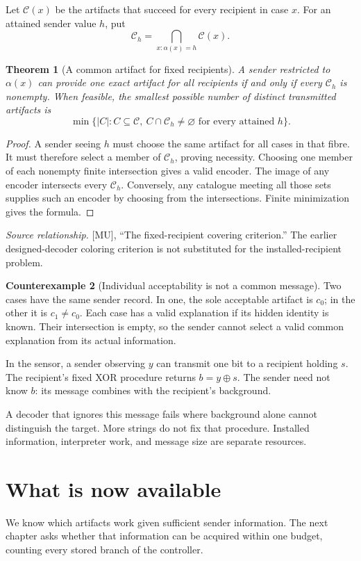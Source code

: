 \documentclass[11pt,oneside,openany]{book}
\newtheorem{theorem}{Theorem}[chapter]
\theoremstyle{definition}\newtheorem{definition}[theorem]{Definition}
\newtheorem{counterexample}[theorem]{Counterexample}
\newcommand{\source}[1]{\par{\small\textit{Source relationship.} #1}\par}
\begin{document}
Let $\mathcal C(x)$ be the artifacts that succeed for every recipient in case $x$. For an attained sender value $h$, put
\[
\mathcal C_h=\bigcap_{x:\alpha(x)=h}\mathcal C(x).
\]

\begin{theorem}[A common artifact for fixed recipients]\label{r:recipient}
A sender restricted to $\alpha(x)$ can provide one exact artifact for all recipients if and only if every $\mathcal C_h$ is nonempty. When feasible, the smallest possible number of distinct transmitted artifacts is
\[
\min\{|C|:C\subseteq\mathcal C,\ C\cap\mathcal C_h\ne\varnothing
\text{ for every attained }h\}.
\]
\end{theorem}
\begin{proof}
A sender seeing $h$ must choose the same artifact for all cases in that fibre. It must therefore select a member of $\mathcal C_h$, proving necessity. Choosing one member of each nonempty finite intersection gives a valid encoder. The image of any encoder intersects every $\mathcal C_h$. Conversely, any catalogue meeting all those sets supplies such an encoder by choosing from the intersections. Finite minimization gives the formula.
\end{proof}
\source{[MU], ``The fixed-recipient covering criterion.'' The earlier designed-decoder coloring criterion is not substituted for the installed-recipient problem.}

\begin{counterexample}[Individual acceptability is not a common message]\label{ce:message}
Two cases have the same sender record. In one, the sole acceptable artifact is $c_0$; in the other it is $c_1\ne c_0$. Each case has a valid explanation if its hidden identity is known. Their intersection is empty, so the sender cannot select a valid common explanation from its actual information.
\end{counterexample}

In the sensor, a sender observing $y$ can transmit one bit to a recipient holding $s$. The recipient's fixed XOR procedure returns $b=y\oplus s$. The sender need not know $b$: its message combines with the recipient's background.

A decoder that ignores this message fails where background alone cannot distinguish the target. More strings do not fix that procedure. Installed information, interpreter work, and message size are separate resources.

\section*{What is now available}
We know which artifacts work given sufficient sender information. The next chapter asks whether that information can be acquired within one budget, counting every stored branch of the controller.
\end{document}
